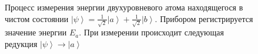 \begin{figure}
\centering



\caption{Процесс измерения энергии двухуровневого атома находящегося в
чистом состоянии $\left|\psi\right> = 
\frac{1}{\sqrt{2}}\left|a\right> + \frac{1}{\sqrt{2}}\left|b\right>$.
Прибором регистрируется значение энергии $E_a$. При измерении
происходит следующая редукция $\left|\psi\right> \to \left|a\right>$
}
\label{fig:add:mesure_ex_a}
\end{figure}
